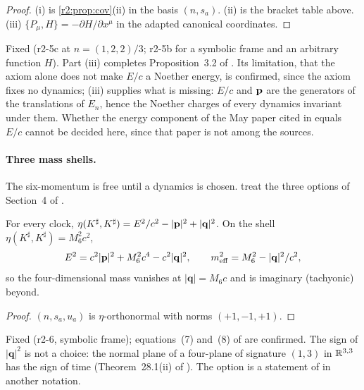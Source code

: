 \begin{proof}
(i) is \cref{r2:prop:cov}(ii) in the basis $(n,s_a)$. (ii) is the bracket table above. (iii) $\{P_\mu,H\}=-\partial H/\partial x^\mu$ in the adapted
canonical coordinates.
\end{proof}

Fixed (r2-5c at $n=(1,2,2)/3$; r2-5b for a symbolic frame and an arbitrary function $H$). Part (iii) completes Proposition~3.2 of \cite{FMB}. Its
limitation, that the axiom alone does not make $E/c$ a Noether energy, is confirmed, since the axiom fixes no dynamics; (iii) supplies what is
missing: $E/c$ and $\mathbf p$ are the generators of the translations of $E_n$, hence the Noether charges of every dynamics invariant under them. Whether the energy component of the May paper cited in \cite{FMB} equals $E/c$ cannot be
decided here, since that paper is not among the sources.

\paragraph{Three mass shells.} The six-momentum is free until a dynamics is chosen.  treat the
three options of Section~4 of \cite{FMB}.

\begin{proposition}
\label{r2:prop:shellI}
For every clock, $\eta(K^\sharp,K^\sharp)=E^2/c^2-|\mathbf p|^2+|\mathbf q|^2$. On the shell $\eta(K^\sharp,K^\sharp)=M_6^2c^2$,
\[
E^2=c^2|\mathbf p|^2+M_6^2c^4-c^2|\mathbf q|^2,\qquad m_{\rm eff}^2=M_6^2-|\mathbf q|^2/c^2 ,
\]
so the four-dimensional mass vanishes at $|\mathbf q|=M_6c$ and is imaginary (tachyonic) beyond.
\end{proposition}

\begin{proof}
$(n,s_a,u_a)$ is $\eta$-orthonormal with norms $(+1,-1,+1)$.
\end{proof}

Fixed (r2-6, symbolic frame); equations~(7) and~(8) of \cite{FMB} are confirmed. The sign of $|\mathbf q|^2$ is not a choice: the normal plane of a
four-plane of signature $(1,3)$ in $\mathbb{R}^{3,3}$ has the sign of time (Theorem~28.1(ii) of \cite{ES17}). The option is a statement of \cite{RE} in another notation.

